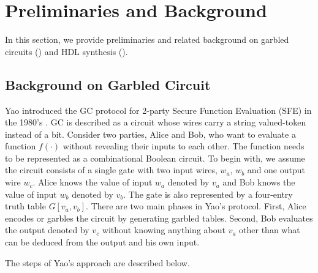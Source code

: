 \chapter{Preliminaries and Background}\label{chap:prem}
In this section, we provide preliminaries and related background on garbled circuits () and HDL synthesis ().

\section{Background on Garbled Circuit}\label{sec:preli_GC}
Yao introduced the GC protocol for 2-party Secure Function Evaluation (SFE) in the 1980's \cite{yao1986generate}.
GC is described as a circuit whose wires carry a string valued-token instead of a bit.
Consider two parties, Alice and Bob, who want to evaluate a function $f(\cdot)$ without revealing their inputs to each other.
The function needs to be represented as a combinational Boolean circuit.
To begin with, we assume the circuit consists of a single gate with two input wires, $w_{a}$, $w_{b}$ and one output wire $w_{c}$.
Alice knows the value of input $w_{a}$ denoted by $v_{a}$ and Bob knows the value of input $w_{b}$ denoted by $v_{b}$.
The gate is also represented by a four-entry truth table $G[v_{a}, v_{b}]$.
There are two main phases in Yao's protocol.
First, Alice encodes or garbles the circuit by generating garbled tables.
Second, Bob evaluates the output denoted by $v_{c}$ without knowing anything about $v_{a}$ other than what can be deduced from the output and his own input.

The steps of Yao's approach are described below.

